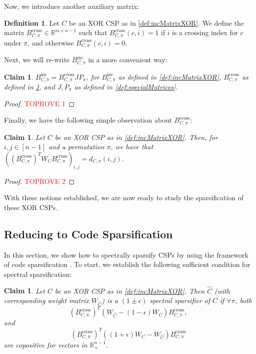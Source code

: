 \documentclass[11pt]{article}
\newtheorem{claim}[theorem]{Claim}
\theoremstyle{definition}
\newtheorem{definition}{Definition}[section]
\newcommand{\R}{\mathbb{R}}
\newcommand{\eps}{\epsilon}
\begin{document}
Now, we introduce another auxiliary matrix:

\begin{definition}\label{def:crossMatrixXOR}
    Let $C$ be an XOR CSP as in \cref{def:incMatrixXOR}. We define the matrix $B^{\text{cross}}_{C, \pi} \in \R^{m \times n-1}$ such that $B^{\text{cross}}_{C, \pi}(c, i) = 1$ if $i$ is a crossing index for $c$ under $\pi$, and otherwise $B^{\text{cross}}_{C, \pi}(c, i) = 0$.
\end{definition}

Next, we will re-write $B^{\text{inc}}_{C, \pi}$ in a more convenient way:

\begin{claim}\label{clm:convenientRep}
	$B^{\text{inc}}_{C, \pi} = B^{\text{cross}}_{C, \pi} J P_{\pi}$, for $B^{\text{inc}}_{C, \pi}$ as defined in \cref{def:incMatrixXOR}, $B^{\text{cross}}_{C, \pi}$ as defined in \cref{def:crossMatrixXOR}, and $J, P_{\pi}$ as defined in  \cref{def:specialMatrices}.
\end{claim}

\begin{proof}\textcolor{red}{TOPROVE 1}\end{proof}

Finally, we have the following simple observation about $B^{\text{cross}}_{C, \pi}$:

\begin{claim}\label{clm:crossingNumberCrossingMatrix}
	Let $C$ be an XOR CSP as in \cref{def:incMatrixXOR}. Then, for $i, j \in [n-1]$ and a permutation $\pi$, we have that $((B^{\text{cross}}_{C, \pi})^T W_C B^{\text{cross}}_{C, \pi})_{i,j} = d_{C, \pi}(i,j)$.
\end{claim}

\begin{proof}\textcolor{red}{TOPROVE 2}\end{proof}

With these notions established, we are now ready to study the sparsification of these XOR CSPs.

\subsection{Reducing to Code Sparsification}

In this section, we show how to spectrally sparsify CSPs by using the framework of code sparsification \cite{KPS24, KPS24c}. To start, we establish the following sufficient condition for spectral sparsification:

\begin{claim}\label{clm:copositiveMatrix}
	Let $C$ be an XOR CSP as in \cref{def:incMatrixXOR}. Then $\hat{C}$ (with corresponding weight matrix $W_{\hat{C}}$) is a $(1 \pm \eps)$ spectral sparsifier of $C$ if $\forall \pi$, both
	\[
	(B^{\text{cross}}_{C, \pi})^T (W_{\hat{C}} - (1 - \eps)W_C) B^{\text{cross}}_{C, \pi},
	\]
	and 
	\[
	(B^{\text{cross}}_{C, \pi})^T ((1 + \eps)W_C - W_{\hat{C}} ) B^{\text{cross}}_{C, \pi} 
	\]
	are copositive for vectors in $\R^{n-1}_+$.
\end{claim}
\end{document}
